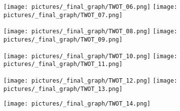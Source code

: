 \begin{figure} \ContinuedFloat
        \centering
        \texttt{[image: pictures/\_final\_graph/TWOT\_06.png]}
        \texttt{[image: pictures/\_final\_graph/TWOT\_07.png]}
\end{figure}
\begin{figure} \ContinuedFloat
        \centering
        \texttt{[image: pictures/\_final\_graph/TWOT\_08.png]}
        \texttt{[image: pictures/\_final\_graph/TWOT\_09.png]}
\end{figure}
\begin{figure} \ContinuedFloat
        \centering
        \texttt{[image: pictures/\_final\_graph/TWOT\_10.png]}
        \texttt{[image: pictures/\_final\_graph/TWOT\_11.png]}
\end{figure}
\begin{figure} \ContinuedFloat
        \centering
        \texttt{[image: pictures/\_final\_graph/TWOT\_12.png]}
        \texttt{[image: pictures/\_final\_graph/TWOT\_13.png]}
\end{figure}
\begin{figure} \ContinuedFloat
        \centering
        \texttt{[image: pictures/\_final\_graph/TWOT\_14.png]}
\end{figure}